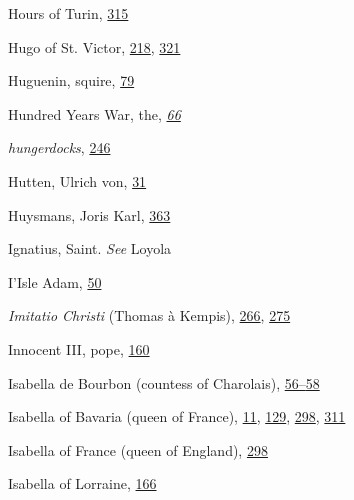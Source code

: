 Hours of Turin,
\protect\hyperlink{20_ILLUSTRATIONS_FOLLOW_PAGE.xhtmlux5cux23page_315}{315}

Hugo of St. Victor,
\protect\hyperlink{14_Chapter_Seven__THE_PIOUS_PERSONA.xhtmlux5cux23page_218}{218},
\protect\hyperlink{20_ILLUSTRATIONS_FOLLOW_PAGE.xhtmlux5cux23page_321}{321}

Huguenin, squire,
\protect\hyperlink{10_Chapter_Three__THE_HEROIC_DREAM.xhtmlux5cux23page_79}{79}

Hundred Years War, the,
\emph{\protect\hyperlink{10_Chapter_Three__THE_HEROIC_DREAM.xhtmlux5cux23page_66}{66}}

\emph{hungerdocks},
\protect\hyperlink{16_Chapter_Nine__THE_DECLINE_OF_SYM.xhtmlux5cux23page_246}{246}

Hutten, Ulrich von,
\protect\hyperlink{09_Chapter_Two__THE_CRAVING_FOR_A_M.xhtmlux5cux23page_31}{31}

Huysmans, Joris Karl,
\protect\hyperlink{21_Chapter_Thirteen__IMAGE_AND_WORD.xhtmlux5cux23page_363}{363}

Ignatius, Saint. \emph{See} Loyola

I'Isle Adam,
\protect\hyperlink{09_Chapter_Two__THE_CRAVING_FOR_A_M.xhtmlux5cux23page_50}{50}

\emph{Imitatio Christi} (Thomas à Kempis),
\protect\hyperlink{17_Chapter_Ten__THE_FAILURE_OF_IMAG.xhtmlux5cux23page_266}{266},
\protect\hyperlink{18_Chapter_Eleven__THE_FORMS_OF_THO.xhtmlux5cux23page_275}{275}

Innocent III, pope,
\protect\hyperlink{12_Chapter_Five__THE_VISION_OF_DEAT.xhtmlux5cux23page_160}{160}

Isabella de Bourbon (countess of Charolais),
\protect\hyperlink{09_Chapter_Two__THE_CRAVING_FOR_A_M.xhtmlux5cux23page_56}{56--}\protect\hyperlink{09_Chapter_Two__THE_CRAVING_FOR_A_M.xhtmlux5cux23page_58}{58}

Isabella of Bavaria (queen of France),
\protect\hyperlink{08_Chapter_One__THE_PASSIONATE_INTE.xhtmlux5cux23page_11}{11},
\protect\hyperlink{11_Chapter_Four__THE_FORMS_OF_LOVE.xhtmlux5cux23page_129}{129},
\protect\hyperlink{20_ILLUSTRATIONS_FOLLOW_PAGE.xhtmlux5cux23page_298}{298},
\protect\hyperlink{20_ILLUSTRATIONS_FOLLOW_PAGE.xhtmlux5cux23page_311}{311}

Isabella of France (queen of England),
\protect\hyperlink{20_ILLUSTRATIONS_FOLLOW_PAGE.xhtmlux5cux23page_298}{298}

Isabella of Lorraine,
\protect\hyperlink{12_Chapter_Five__THE_VISION_OF_DEAT.xhtmlux5cux23page_166}{166}


